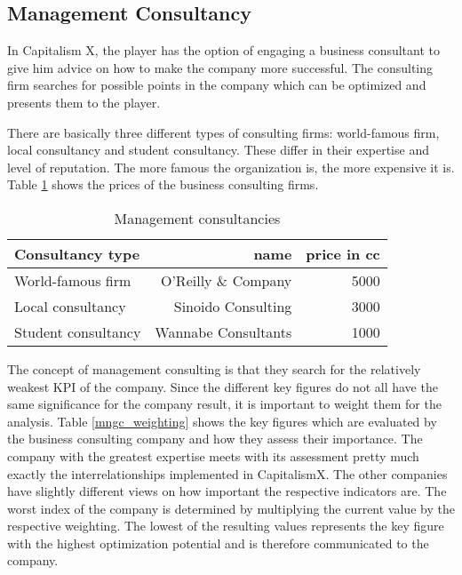 \subsection{Management Consultancy} \label{management_consultancy_simulation}
In Capitalism X, the player has the option of engaging a business consultant to give him advice on how to make the company more successful. 
The consulting firm searches for possible points in the company which can be optimized and presents them to the player.

There are basically three different types of consulting firms: world-famous firm, local consultancy and student consultancy. These differ in their expertise and level of reputation. The more famous the organization is, the more expensive it is. Table \ref{mng_consultancy} shows the prices of the business consulting firms. 

\begin{table}[ht]
\centering
\begin{tabular}{|l|r|r|}
\hline
Consultancy type        & name  & price in cc \\ \hline
World-famous firm       & O'Reilly \& Company     & 5000     \\
Local consultancy       & Sinoido Consulting     & 3000     \\
Student consultancy     & Wannabe Consultants    & 1000     \\
\hline
\end{tabular}
\caption{Management consultancies}
\label{mng_consultancy}
\end{table}

The concept of management consulting is that they search for the relatively weakest KPI of the company. Since the different key figures do not all have the same significance for the company result, it is important to weight them for the analysis.
Table \ref{mngc_weighting} shows the key figures which are evaluated by the business consulting company and how they assess their importance.
The company with the greatest expertise meets with its assessment pretty much exactly the interrelationships implemented in CapitalismX. The other companies have slightly different views on how important the respective indicators are. 
The worst index of the company is determined by multiplying the current value by the respective weighting. The lowest of the resulting values represents the key figure with the highest optimization potential and is therefore communicated to the company. 
 

